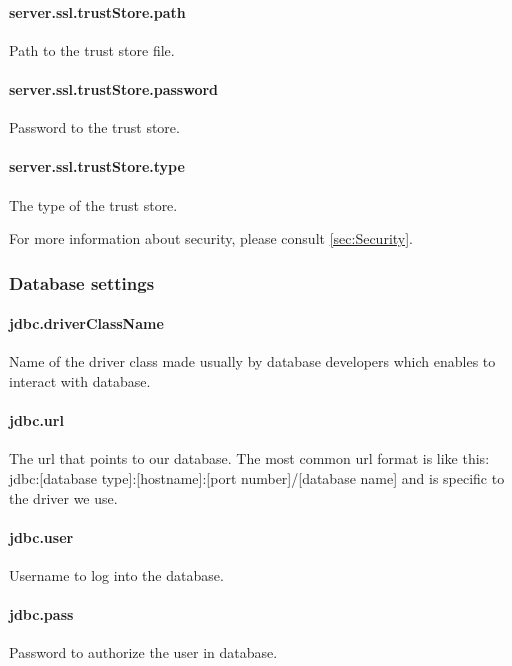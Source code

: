 \paragraph{server.ssl.trustStore.path}
Path to the trust store file.

\paragraph{server.ssl.trustStore.password}
Password to the trust store.

\paragraph{server.ssl.trustStore.type}
The type of the trust store.

\vspace{0.75cm}
For more information about security, please consult \ref{sec:Security}.

\subsubsection{Database settings}
\label{sssec:DataSettings}

\paragraph{jdbc.driverClassName}
Name of the driver class made usually by database developers which enables to interact with database.

\paragraph{jdbc.url}
 The url that points to our database. The most common url format is like this:
jdbc:[database type]:[hostname]:[port number]/[database name]
and is specific to the driver we use.

\paragraph{jdbc.user}
Username to log into the database.
\paragraph{jdbc.pass}
Password to authorize the user in database.


